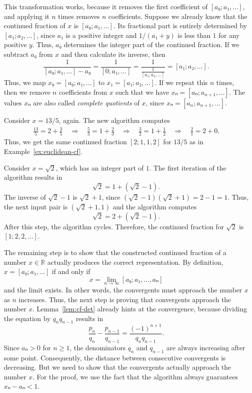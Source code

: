 This transformation works, because it removes the first coefficient of $[a₀; a₁, …]$,
and applying it $n$ times removes $n$ coefficients.
Suppose we already know that the continued fraction of $x$ is $[a₀; a₁, …]$.
Its fractional part is entirely determined by $[a₁; a₂, …]$,
since $a₁$ is a positive integer and $1/(a₁ + y)$ is less than $1$ for any positive $y$.
Thus, $a₀$ determines the integer part of the continued fraction.
If we subtract $a₀$ from $x$ and then calculate its inverse, then
\[
  \frac{1}{[a₀; a₁, …] - a₀} = \frac{1}{[0; a₁, …]} = \frac{1}{\frac{1}{[a₁; a₂, …]}} = [a₁; a₂, …].
\]
Thus, we map $x₀ = [a₀; a₁, …]$ to $x₁ = [a₁; a₂, …]$.
If we repeat this $n$ times, then we remove $n$ coefficients from $x$ such that we have $xₙ = [aₙ; a_{n+1}, …]$.
The values $xₙ$ are also called \emph{complete quotients} of $x$,
since $xₙ = [a_n; a_{n+1}, …]$.

\begin{example}
  \label{ex:cf-rat}
  Consider $x = 13/5$, again.
  The new algorithm computes
  \begin{align*}
    \frac{13}{5} = 2 + \frac{3}{5}
    \quad \Rightarrow \quad
    \frac{5}{3} = 1 + \frac{2}{3}
    \quad \Rightarrow \quad
    \frac{3}{2} = 1 + \frac{1}{2}
    \quad \Rightarrow \quad
    \frac{2}{1} = 2 + 0.
  \end{align*}
  Thus, we get the same continued fraction $[2; 1, 1, 2]$ for $13/5$
  as in Example~\ref{ex:euclidean-cf}.
\end{example}

\begin{example}
  \label{ex:cf-irrat}
  Consider $x = \sqrt{2}$, which has an integer part of $1$.
  The first iteration of the algorithm results in
  \[
    \sqrt{2} = 1 + (\sqrt{2} - 1).
  \]
  The inverse of $\sqrt{2} - 1$ is $\sqrt{2} + 1$,
  since $(\sqrt{2} - 1)(\sqrt{2} + 1) = 2 - 1 = 1$.
  Thus, the next input pair is $(\sqrt{2} + 1, 1)$ and the algorithm computes
  \[
    \sqrt{2} = 2 + (\sqrt{2} - 1).
  \]
  After this step,
  the algorithm cycles.
  Therefore, the continued fraction for $\sqrt{2}$ is $[1; 2, 2, …]$.
\end{example}

The remaining step is to show that the constructed continued fraction of a
number $x ∈ ℝ$ actually produces the correct representation.
By definition, $x = [a₀; a₁, …]$ if and only if
\[
  x = \lim_{n → ∞} [a₀; a₁, …, aₙ]
\]
and the limit exists.
In other words, the convergents must approach the number $x$ as $n$ increases.
Thus, the next step is proving that convergents approach the number $x$.
Lemma~\ref{lem:cf-det} already hints at the convergence,
because dividing the equation by $q_n q_{n-1}$ results in
\[
  \frac{p_n}{q_n} - \frac{p_{n-1}}{q_{n-1}} = \frac{(-1)^{n+1}}{q_n q_{n-1}}.
\]
Since $aₙ > 0$ for $n ≥ 1$, the denominators $q_n$ and $q_{n-1}$ are always
increasing after some point.
Consequently, the distance between consecutive convergents is decreasing.
But we need to show that the convergents actually approach the number $x$.
For the proof, we use the fact that the algorithm always guarantees $xₙ - aₙ < 1$.

